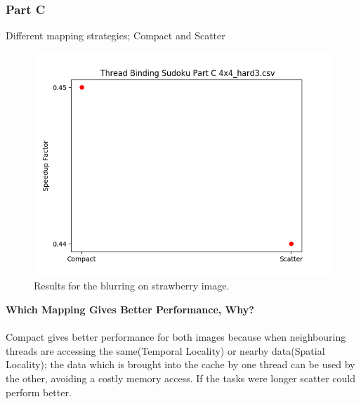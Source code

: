 \documentclass{article}
\newcommand\tab[1][0.5cm]{\hspace*{#1}}
\begin{document}
\subsubsection{Part C}
\begin{description}
    \item[Different mapping strategies; Compact and Scatter]
\end{description}
\begin{figure}[!htb]
    \centering
    \includegraphics[width=1\linewidth]{./img/binding_part_2_C.png}
    \caption{Results for the blurring on strawberry image.}
\end{figure}
\textbf{Which Mapping Gives Better Performance, Why?}\\
\\ \tab Compact gives better performance for both images because 
when neighbouring threads are accessing the same(Temporal Locality) or nearby data(Spatial Locality);
the data which is brought into the cache by one thread can be used 
by the other, avoiding a costly memory access.
If the tasks were longer scatter could perform better. 

\newpage
\end{document}
